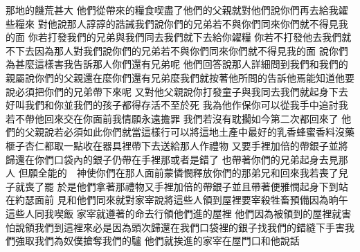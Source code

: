 \bchapter%
那地的饑荒甚大\chuan 
{}他們從帶來的糧食喫盡了\chientien 他們的父親就對他們說\chientien 你們再去給我糴些糧來\chuan 
{}對他說\chientien 那人諄諄的誥誡我們\chientien 說\chientien 你們的兄弟若不與你們同來\chientien 你們就不得見我的面\chuan 
{}你若打發我們的兄弟與我們同去\chientien 我們就下去給你糴糧\chuan 
{}你若不打發他去\chientien 我們就不下去\chientien 因為那人對我們說\chientien 你們的兄弟若不與你們同來\chientien 你們就不得見我的面\chuan 
{}說\chientien 你們為甚麼這樣害我\chientien 告訴那人你們還有兄弟呢\chuan 
{}他們回答說\chientien 那人詳細問到我們\chientien 和我們的親屬\chientien 說\chientien 你們的父親還在麼\yuentien 你們還有兄弟麼\chuan 我們就按著他所問的告訴他\chientien 焉能知道他要說\chientien 必須把你們的兄弟帶下來呢\chuan 
{}又對他父親說\chientien 你打發童子與我同去\chientien 我們就起身下去\chientien 好叫我們和你\chientien 並我們的孩子都得存活\chientien 不至於死\chuan 
{}我為他作保\chientien 你可以從我手中追討\chientien 我若不帶他回來交在你面前\chientien 我情願永遠擔罪\chuan 
{}我們若沒有耽擱\chientien 如今第二次都回來了\chuan 
{}他們的父親說\chientien 若必須如此\chientien 你們就當這樣行\chientien 可以將這地\chientien 土產中最好的乳香\chientien 蜂蜜\chientien 香料\chientien 沒藥\chientien 榧子\chientien 杏仁\chientien 都取一點收在器具裡\chientien 帶下去送給那人作禮物\chuan 
{}又要手裡加倍的帶銀子\chientien 並將歸還在你們口袋內的銀子\chientien 仍帶在手裡\yuentien 那或者是錯了\chuan 
{}也帶著你們的兄弟\chientien 起身去見那人\chuan 
{}但願全能的　神使你們在那人面前蒙憐憫\chientien 釋放你們的那弟兄和回來\yuentien 我若喪了兒子\chientien 就喪了罷\chuan 
{}於是他們拿著那禮物\chientien 又手裡加倍的帶銀子\chientien 並且帶著便雅憫\chientien 起身下到站在約瑟面前\chuan\Chuan
{}見和他們同來\chientien 就對家宰說\chientien 將這些人領到屋裡\chientien 要宰殺牲畜\chientien 預備\chientien 因為晌午這些人同我喫飯\chuan 
{}家宰就遵著的命去行\chientien 領他們進的屋裡\chuan 
{}他們因為被領到的屋裡\chientien 就害怕\chientien 說\chientien 領我們到這裡來\chientien 必是因為頭次歸還在我們口袋裡的銀子\chientien 找我們的錯縫\chientien 下手害我們\chientien 強取我們為奴僕\chientien 搶奪我們的驢\chuan 
{}他們就挨進的家宰\chientien 在屋門口和他說話\chientien 
